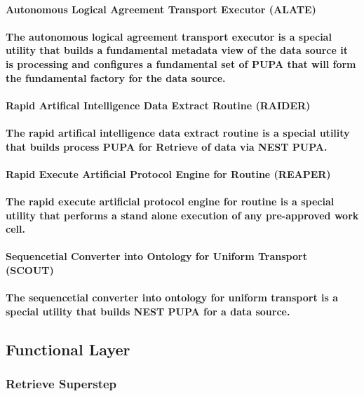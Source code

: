 \documentclass{acm_proc_article-sp}
\begin{document}
\paragraph{\textbf{Autonomous Logical Agreement Transport Executor (ALATE)}}
\paragraph{The autonomous logical agreement transport executor is a special utility that builds a fundamental metadata view of the data source it is processing and configures a fundamental set of PUPA that will form the fundamental factory for the data source.}
\paragraph{\textbf{Rapid Artifical Intelligence Data Extract Routine (RAIDER)}}
\paragraph{The rapid artifical intelligence data extract routine is a special utility that builds process PUPA for Retrieve of data via NEST PUPA.}
\paragraph{\textbf{Rapid Execute Artificial Protocol Engine for Routine (REAPER)}}
\paragraph{The rapid execute artificial protocol engine for routine is a special utility that performs a stand alone execution of any pre-approved work cell.}
\paragraph{\textbf{Sequencetial Converter into Ontology for Uniform Transport (SCOUT)}}
\paragraph{The sequencetial converter into ontology for uniform transport is a special utility that builds NEST PUPA for a data source.}
\subsection{Functional Layer}
\subsubsection{Retrieve Superstep}
\end{document}
